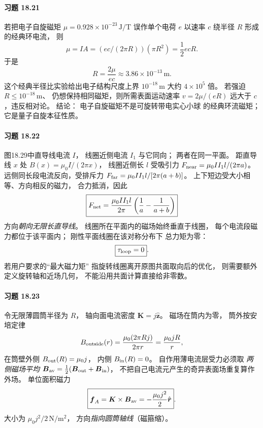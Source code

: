 \paragraph{习题 18.21}
若把电子自旋磁矩
\(\mu=0.928\times10^{-23}\,\mathrm{J/T}\)
误作单个电荷 \(e\) 以速率 \(c\)
绕半径 \(R\) 形成的经典环电流，
则
\[
 \mu=IA=(e c/(2\pi R))(\pi R^2)
 =\frac12ecR.
\]
于是
\[
 \boxed{R=\frac{2\mu}{ec}
 \approx3.86\times10^{-13}\,\mathrm m}.
\]
这个经典半径比实验给出电子结构尺度上界
\(10^{-18}\,\mathrm m\) 大约 \(4\times10^5\) 倍。
若强迫 \(R\le10^{-18}\,\mathrm m\)、
仍想保持相同磁矩，则所需表面运动速率
\(v=2\mu/(eR)\)
远大于 \(c\)，违反相对论。
结论：
\(\boxed{\text{电子自旋磁矩不是可旋转带电实心小球
的经典环流磁矩}}\)；
它是量子自旋本征性质。

\paragraph{习题 18.22}
图18.29中直导线电流 \(I\)，
线圈近侧电流 \(I_1\) 与它同向；
两者在同一平面。
距直导线 \(x\) 处
\(B(x)=\mu_0I/(2\pi x)\)，
线圈近侧长 \(l\)
受吸引力
\(F_{\rm near}=\mu_0II_1l/(2\pi a)\)。
远侧同长段电流反向，受排斥力
\(F_{\rm far}=\mu_0II_1l/[2\pi(a+b)]\)。
上下短边受大小相等、方向相反的磁力，
合力抵消，因此
\[
 \boxed{F_{\rm net}
 =\frac{\mu_0II_1l}{2\pi}
 \left(\frac1a-\frac1{a+b}\right)}
\]
方向\emph{朝向无限长直导线}。
线圈所在平面内的磁场始终垂直于线圈，
每个电流段磁力都位于该平面内；
刚性平面线圈在该对称分布下
总力矩为零：
\[
 \boxed{\tau_{\rm loop}=0}.
\]
若用户要求的“最大磁力矩”
指旋转线圈离开原图共面取向后的优化，
则需要额外定义旋转轴和近场几何，
不能沿用共面计算直接给非零数。

\paragraph{习题 18.23}
令无限薄圆筒半径为 \(R\)，
轴向面电流密度
\(\boldsymbol K=j\hat{\boldsymbol z}\)。
磁场在筒内为零，
筒外按安培定律
\[
 B_{\rm outside}(r)=\frac{\mu_0(2\pi Rj)}{2\pi r}
 =\frac{\mu_0jR}{r},
\]
在筒壁外侧 \(B_{\rm out}(R)=\mu_0j\)，
内侧 \(B_{\rm in}(R)=0\)。
自作用薄电流层受力必须取
\emph{两侧磁场平均}
\(\boldsymbol B_{\rm av}
 =\tfrac12(\boldsymbol B_{\rm out}+
 \boldsymbol B_{\rm in})\)，
不把自己电流元产生的奇异表面场重复算作外场。
单位面积磁力
\[
 \boxed{\boldsymbol f_A=
 \boldsymbol K\times\boldsymbol B_{\rm av}
 =-\frac{\mu_0j^2}{2}
 \hat{\boldsymbol r}}.
\]
大小为
\(\boxed{\mu_0j^2/2\,\mathrm{N/m^2}}\)，
方向\emph{指向圆筒轴线}（磁箍缩）。

